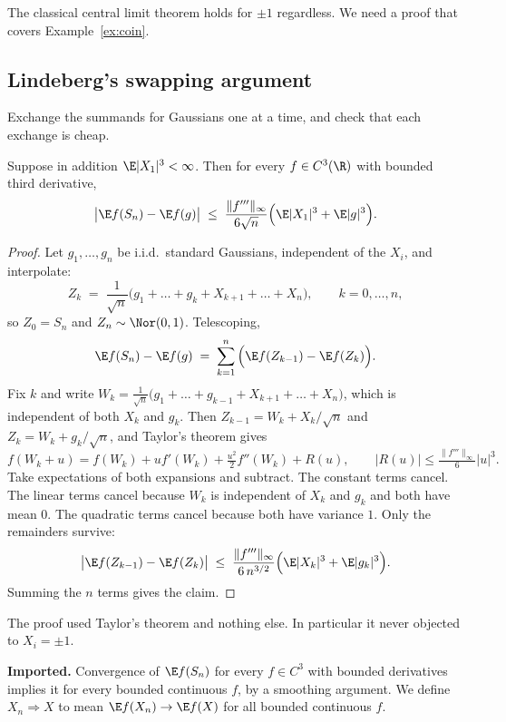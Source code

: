 \documentclass[11pt]{article}
\begin{document}
The classical central limit theorem holds for $\pm1$ regardless. We need a proof that covers Example~\ref{ex:coin}.

\subsection{Lindeberg's swapping argument}

Exchange the summands for Gaussians one at a time, and check that each exchange is cheap.

\begin{theorem}\label{thm:clt}
Suppose in addition $\E|X_1|^3<\infty$. Then for every $f\in C^3(\R)$ with bounded third derivative,
\[
\big|\E f(S_n)-\E f(g)\big|\;\le\;\frac{\|f'''\|_\infty}{6\sqrt n}\Big(\E|X_1|^3+\E|g|^3\Big).
\]
\end{theorem}

\begin{proof}
Let $g_1,\dots,g_n$ be i.i.d.\ standard Gaussians, independent of the $X_i$, and interpolate:
\[
Z_k \;=\; \frac{1}{\sqrt n}\big(g_1+\dots+g_k+X_{k+1}+\dots+X_n\big),\qquad k=0,\dots,n,
\]
so $Z_0=S_n$ and $Z_n\sim\Nor(0,1)$. Telescoping,
\[
\E f(S_n)-\E f(g)\;=\;\sum_{k=1}^n\Big(\E f(Z_{k-1})-\E f(Z_k)\Big).
\]
Fix $k$ and write $W_k=\frac{1}{\sqrt n}\big(g_1+\dots+g_{k-1}+X_{k+1}+\dots+X_n\big)$, which is independent of both $X_k$ and $g_k$. Then $Z_{k-1}=W_k+X_k/\sqrt n$ and $Z_k=W_k+g_k/\sqrt n$, and Taylor's theorem gives
\[
f(W_k+u)=f(W_k)+uf'(W_k)+\tfrac{u^2}{2}f''(W_k)+R(u),\qquad |R(u)|\le\tfrac{\|f'''\|_\infty}{6}|u|^3 .
\]
Take expectations of both expansions and subtract. The constant terms cancel. The linear terms cancel because $W_k$ is independent of $X_k$ and $g_k$ and both have mean $0$. The quadratic terms cancel because both have variance $1$. Only the remainders survive:
\[
\big|\E f(Z_{k-1})-\E f(Z_k)\big|\;\le\;\frac{\|f'''\|_\infty}{6\,n^{3/2}}\Big(\E|X_k|^3+\E|g_k|^3\Big).
\]
Summing the $n$ terms gives the claim.
\end{proof}

The proof used Taylor's theorem and nothing else. In particular it never objected to $X_i=\pm1$.

\begin{imported}
\textbf{Imported.} Convergence of $\E f(S_n)$ for every $f\in C^3$ with bounded derivatives implies it for every bounded continuous $f$, by a smoothing argument. We define $X_n\Rightarrow X$ to mean $\E f(X_n)\to\E f(X)$ for all bounded continuous $f$.
\end{imported}
\end{document}
